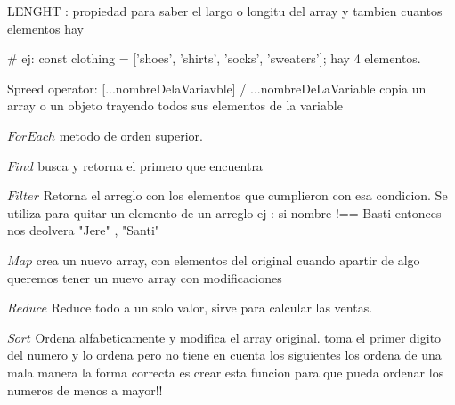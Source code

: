 LENGHT : propiedad para saber el largo o longitu del array y tambien cuantos elementos hay

# ej: const clothing = ['shoes', 'shirts', 'socks', 'sweaters']; hay 4 elementos.

Spreed operator: [...nombreDelaVariavble] / {...nombreDeLaVariable} copia un array o un objeto 
trayendo todos sus elementos de la variable

$ForEach$
metodo de orden superior.

$Find$
busca y retorna el primero que encuentra

$Filter$
Retorna el arreglo con los elementos que cumplieron con esa condicion.
Se utiliza para quitar un elemento de un arreglo ej : si nombre !== Basti entonces nos deolvera "Jere" , "Santi"

$Map$ 
crea un nuevo array, con elementos del original cuando apartir de algo queremos tener un nuevo array con modificaciones

$Reduce$
Reduce todo a un solo valor, sirve para calcular las ventas.

$Sort$
Ordena alfabeticamente y modifica el array original.
toma el primer digito del numero y lo ordena pero no tiene en cuenta los siguientes
los ordena de una mala manera la forma correcta es crear esta funcion
para que pueda ordenar los numeros de menos a mayor!!